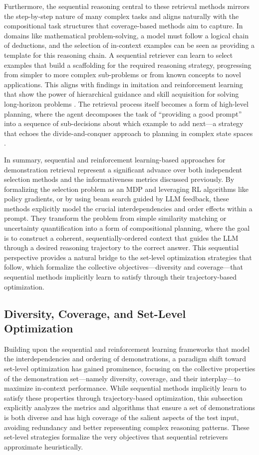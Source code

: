\documentclass[11pt]{article}
\begin{document}
Furthermore, the sequential reasoning central to these retrieval methods mirrors the step-by-step nature of many complex tasks and aligns naturally with the compositional task structures that coverage-based methods aim to capture. In domains like mathematical problem-solving, a model must follow a logical chain of deductions, and the selection of in-context examples can be seen as providing a template for this reasoning chain. A sequential retriever can learn to select examples that build a scaffolding for the required reasoning strategy, progressing from simpler to more complex sub-problems or from known concepts to novel applications. This aligns with findings in imitation and reinforcement learning that show the power of hierarchical guidance and skill acquisition for solving long-horizon problems \cite{ref135,ref136}. The retrieval process itself becomes a form of high-level planning, where the agent decomposes the task of ``providing a good prompt'' into a sequence of sub-decisions about which example to add next---a strategy that echoes the divide-and-conquer approach to planning in complex state spaces \cite{ref137}.

In summary, sequential and reinforcement learning-based approaches for demonstration retrieval represent a significant advance over both independent selection methods and the informativeness metrics discussed previously. By formalizing the selection problem as an MDP and leveraging RL algorithms like policy gradients, or by using beam search guided by LLM feedback, these methods explicitly model the crucial interdependencies and order effects within a prompt. They transform the problem from simple similarity matching or uncertainty quantification into a form of compositional planning, where the goal is to construct a coherent, sequentially-ordered context that guides the LLM through a desired reasoning trajectory to the correct answer. This sequential perspective provides a natural bridge to the set-level optimization strategies that follow, which formalize the collective objectives---diversity and coverage---that sequential methods implicitly learn to satisfy through their trajectory-based optimization.

\subsection{Diversity, Coverage, and Set-Level Optimization}

Building upon the sequential and reinforcement learning frameworks that model the interdependencies and ordering of demonstrations, a paradigm shift toward set-level optimization has gained prominence, focusing on the collective properties of the demonstration set---namely diversity, coverage, and their interplay---to maximize in-context performance. While sequential methods implicitly learn to satisfy these properties through trajectory-based optimization, this subsection explicitly analyzes the metrics and algorithms that ensure a set of demonstrations is both diverse and has high coverage of the salient aspects of the test input, avoiding redundancy and better representing complex reasoning patterns. These set-level strategies formalize the very objectives that sequential retrievers approximate heuristically.
\end{document}

